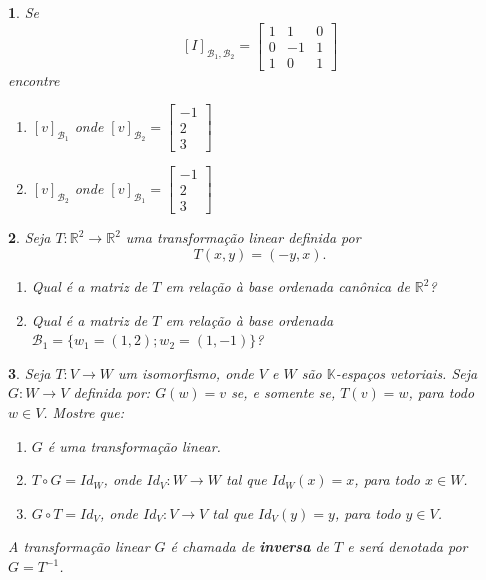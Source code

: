 \documentclass[12pt]{exam}
\newtheorem{exercicio}{}
\newcommand{\real}{\mathbb{R}}
\newcommand{\cp}[1]{\mathbb{#1}}
\begin{document}
\begin{exercicio}
  Se
  \[
    [I]_{\mathcal{B}_1,\mathcal{B}_2} = \begin{bmatrix}
      1 & 1 & 0\\
      0 & -1 & 1\\
      1 & 0 & 1
    \end{bmatrix}
  \]
  encontre
  \begin{enumerate}[label=({\alph*})]
    \item $[v]_{\mathcal{B}_1}$ onde $[v]_{\mathcal{B}_2} = \begin{bmatrix}
      -1\\2\\3
    \end{bmatrix}$
    \item $[v]_{\mathcal{B}_2}$ onde $[v]_{\mathcal{B}_1} = \begin{bmatrix}
      -1\\2\\3
    \end{bmatrix}$
  \end{enumerate}
\end{exercicio}

\begin{exercicio}
  Seja $T : \real^2 \to \real^2$ uma transforma\c{c}\~ao linear definida por
  \[
    T(x,y) = (-y,x).
  \]
  \begin{enumerate}[label=({\alph*})]
    \item Qual \'e a matriz de $T$ em rela\c{c}\~ao \`a base ordenada can\^onica de $\real^2$?
    \item Qual \'e a matriz de $T$ em rela\c{c}\~ao \`a base ordenada $\mathcal{B}_1 = \{w_1 = (1,2); w_2 = (1,-1)\}$?
  \end{enumerate}
\end{exercicio}

\begin{exercicio}
  Seja $T : V \to W$ um isomorfismo, onde $V$ e $W$ são $\cp{K}$-espaços vetoriais. Seja $G : W \to V$ definida por: $G(w) = v$ se, e somente se, $T(v) = w$, para todo $w \in V$. Mostre que:
  \begin{enumerate}[label=({\alph*})]
    \item $G$ é uma transformação linear.
    \item $T\circ G = Id_W$, onde $Id_V : W \to W$ tal que $Id_W(x) = x$, para todo $x \in W$.
    \item $G\circ T = Id_V$, onde $Id_V : V \to V$ tal que $Id_V(y) = y$, para todo $y \in V$.
  \end{enumerate}
  A transformação linear $G$ é chamada de \textbf{inversa} de $T$ e será denotada por $G = T^{-1}$.
\end{exercicio}
\end{document}
